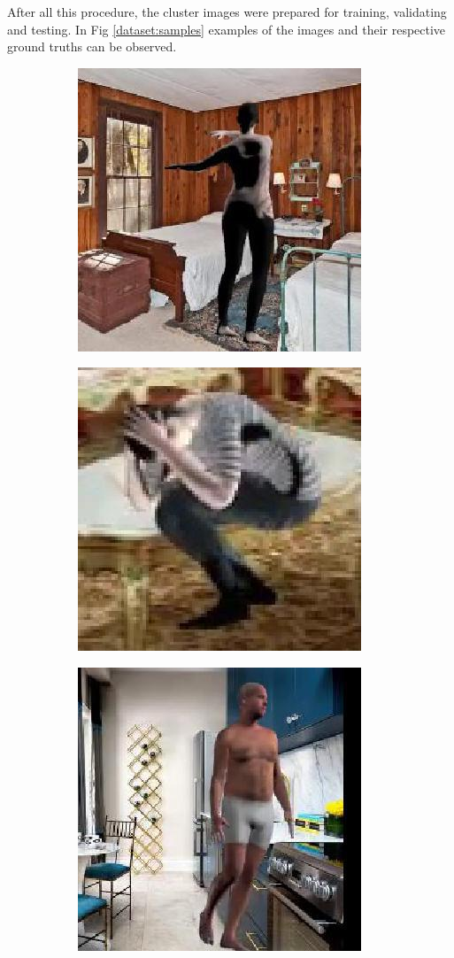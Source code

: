 \documentclass[12pt,a4paper]{article}
\begin{document}
After all this procedure, the cluster images were prepared for training, validating and testing. In Fig \ref{dataset:samples} examples of the images and their respective ground truths can be observed.

\begin{figure}
\centering
\begin{subfigure}{.19\textwidth}
\centering
  \includegraphics[scale=0.3]{80_15_c0002_85.jpg}
\end{subfigure}
\begin{subfigure}{.19\textwidth}
  \centering
  \includegraphics[scale=0.3]{ung_77_09_c0001_67.jpg}
\end{subfigure}
\begin{subfigure}{.19\textwidth}
  \centering
  \includegraphics[scale=0.3]{ung_91_62_c0003_87.jpg}

\end{subfigure}
\end{figure}
\end{document}
